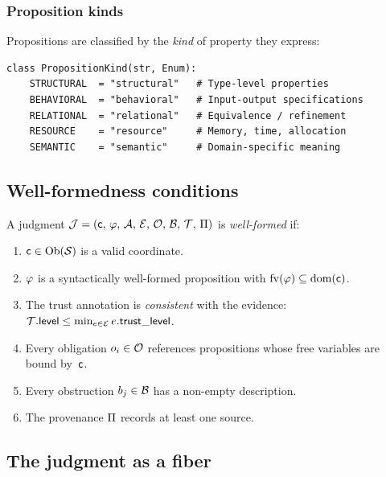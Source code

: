 \documentclass[11pt]{article}
\begin{document}
\subsubsection{Proposition kinds}

Propositions are classified by the \emph{kind} of property they express:

\begin{lstlisting}[caption={Proposition kinds.}, label=lst:propkind]
class PropositionKind(str, Enum):
    STRUCTURAL  = "structural"   # Type-level properties
    BEHAVIORAL  = "behavioral"   # Input-output specifications
    RELATIONAL  = "relational"   # Equivalence / refinement
    RESOURCE    = "resource"     # Memory, time, allocation
    SEMANTIC    = "semantic"     # Domain-specific meaning
\end{lstlisting}

\subsection{Well-formedness conditions}

\begin{definition}\label{def:wf}
A judgment $\mathcal{J} = (\mathsf{c},\,\varphi,\,\mathcal{A},\,\mathcal{E},\,\mathcal{O},\,\mathcal{B},\,\mathcal{T},\,\Pi)$ is \emph{well-formed} if:
\begin{enumerate}[label=(WF\arabic*)]
  \item \label{wf:coord} $\mathsf{c} \in \mathrm{Ob}(\mathcal{S})$ is a valid coordinate.
  \item \label{wf:prop} $\varphi$ is a syntactically well-formed proposition
        with $\mathrm{fv}(\varphi) \subseteq \mathrm{dom}(\mathsf{c})$.
  \item \label{wf:trust-ev} The trust annotation is \emph{consistent} with
        the evidence:
        $\mathcal{T}.\mathsf{level} \leq \min_{e \in \mathcal{E}} e.\mathsf{trust\_level}$.
  \item \label{wf:oblig} Every obligation $o_i \in \mathcal{O}$ references
        propositions whose free variables are bound by~$\mathsf{c}$.
  \item \label{wf:obstr} Every obstruction $b_j \in \mathcal{B}$ has a non-empty
        description.
  \item \label{wf:prov} The provenance $\Pi$ records at least one source.
\end{enumerate}
\end{definition}

\subsection{The judgment as a fiber}
\end{document}
